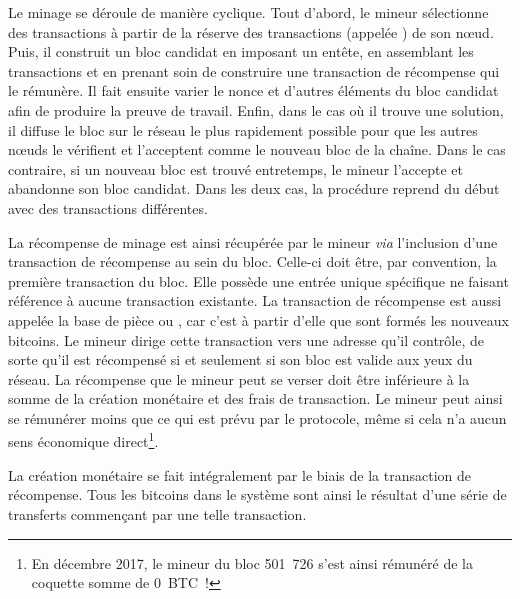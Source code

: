
Le minage se déroule de manière cyclique. Tout d'abord, le mineur sélectionne des transactions à partir de la réserve des transactions (appelée ) de son nœud. Puis, il construit un bloc candidat en imposant un entête, en assemblant les transactions et en prenant soin de construire une transaction de récompense qui le rémunère. Il fait ensuite varier le nonce et d'autres éléments du bloc candidat afin de produire la preuve de travail. Enfin, dans le cas où il trouve une solution, il diffuse le bloc sur le réseau le plus rapidement possible pour que les autres nœuds le vérifient et l'acceptent comme le nouveau bloc de la chaîne. Dans le cas contraire, si un nouveau bloc est trouvé entretemps, le mineur l'accepte et abandonne son bloc candidat. Dans les deux cas, la procédure reprend du début avec des transactions différentes.

La récompense de minage est ainsi récupérée par le mineur \emph{via} l'inclusion d'une transaction de récompense au sein du bloc. Celle-ci doit être, par convention, la première transaction du bloc. Elle possède une entrée unique spécifique ne faisant référence à aucune transaction existante. La transaction de récompense est aussi appelée la base de pièce ou , car c'est à partir d'elle que sont formés les nouveaux bitcoins. Le mineur dirige cette transaction vers une adresse qu'il contrôle, de sorte qu'il est récompensé si et seulement si son bloc est valide aux yeux du réseau. La récompense que le mineur peut se verser doit être inférieure à la somme de la création monétaire et des frais de transaction. Le mineur peut ainsi se rémunérer moins que ce qui est prévu par le protocole, même si cela n'a aucun sens économique direct\footnote{En décembre 2017, le mineur du bloc 501~726 s'est ainsi rémunéré de la coquette somme de 0~BTC~!}.


La création monétaire se fait intégralement par le biais de la transaction de récompense. Tous les bitcoins dans le système sont ainsi le résultat d'une série de transferts commençant par une telle transaction.


